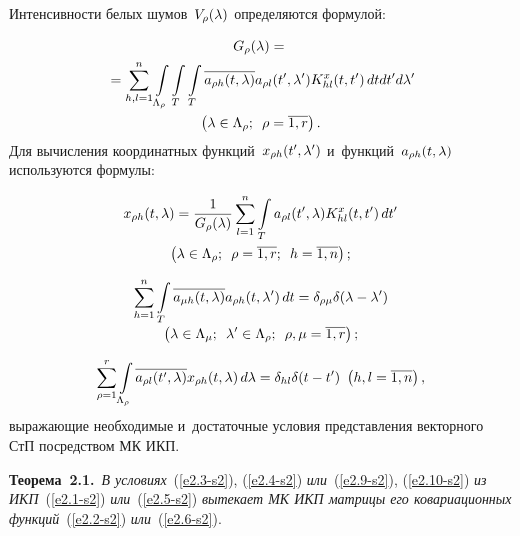 \begin{multicols}{2}
Интенсивности белых шумов~$V_\rho (\lambda)$ определяются формулой:

\vspace*{-4pt}

\noindent
     \begin{multline*}
     G_\rho (\lambda) = {}\\
     {}=\sum\limits_{h,l=1}^n   \int\limits_{\Lambda_\rho}\int\limits_{T}\int\limits_T 
\overline{a_{\rho h} (t,\lambda)}a_{\rho l}(t',\lambda') K_{hl}^x (t,t')\, dt 
dt'd\lambda'\\
 \left(\lambda\in \Lambda_\rho; \enskip \rho=\overline{1,r}\right).
\end{multline*}
Для вычисления координатных функций~$x_{\rho h} (t',\lambda')$ и~функций~$a_{\rho h} 
(t,\lambda)$ используются формулы:

\pagebreak

\noindent
    \begin{multline}
    x_{\rho h} (t,\lambda) =\displaystyle\frac{\displaystyle 1\mathstrut}{\displaystyle G_\rho (\lambda)\mathstrut} \sum\limits_{l=1}^n \int\limits_T a_{\rho l} 
(t',\lambda)K_{hl}^x(t,t')\,dt'\\
 \left(\lambda\in \Lambda_\rho; \enskip 
\rho=\overline{1,r};\enskip h=\overline{1,n}\right);
\label{e2.9-s2}
\end{multline}

\vspace*{-12pt}

\noindent
 \begin{multline}
    \sum\limits_{h=1}^n \int\limits_T \overline{a_{\mu h} (t,\lambda)}a_{\rho h} 
(t,\lambda')\,dt=\delta_{\rho \mu} \delta (\lambda-\lambda')\\[-2pt]
 \left(\lambda\in \Lambda_\mu; 
\enskip \lambda'\in \Lambda_\rho;\enskip \rho,\mu=\overline{1,r}\right);
\label{e2.10-s2}
\end{multline}

\vspace*{-6pt}

\noindent
    \begin{equation*}
    \sum\limits_{\rho=1}^r \int\limits_{\Lambda_\rho} \overline{a_{\rho l} (t',\lambda)}x_{\rho 
h} (t,\lambda)\,d\lambda=\delta_{hl} \delta (t-t')\  
\left(h,l=\overline{1,n}\right),
\end{equation*}
выражающие необходимые и~достаточные условия представления векторного СтП 
посредством МК ИКП.

\smallskip

\noindent
\textbf{Теорема~2.1.}\ \textit{В условиях}~(\ref{e2.3-s2}), (\ref{e2.4-s2}) 
\textit{или}~(\ref{e2.9-s2}), (\ref{e2.10-s2}) \textit{из ИКП}~(\ref{e2.1-s2}) 
\textit{или}~(\ref{e2.5-s2}) \textit{вытекает МК ИКП 
матрицы его ковариационных функций}~(\ref{e2.2-s2}) \textit{или}~(\ref{e2.6-s2}).


\end{multicols}
